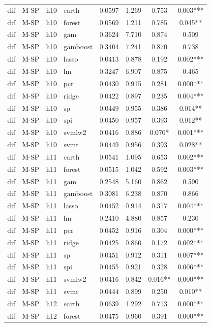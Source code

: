 \begin{ThreePartTable}
\begin{longtable}[t]{llclcccc}
\addlinespace
dif & M-SP & h10 & earth & 0.0597 & 1.269 & 0.753 & 0.003***\\
dif & M-SP & h10 & forest & 0.0569 & 1.211 & 0.785 & 0.045**\\
dif & M-SP & h10 & gam & 0.3624 & 7.710 & 0.874 & 0.509\\
dif & M-SP & h10 & gamboost & 0.3404 & 7.241 & 0.870 & 0.738\\
dif & M-SP & h10 & lasso & 0.0413 & 0.878 & 0.192 & 0.002***\\
dif & M-SP & h10 & lm & 0.3247 & 6.907 & 0.875 & 0.465\\
dif & M-SP & h10 & pcr & 0.0430 & 0.915 & 0.281 & 0.000***\\
dif & M-SP & h10 & ridge & 0.0422 & 0.897 & 0.235 & 0.004***\\
dif & M-SP & h10 & sp & 0.0449 & 0.955 & 0.386 & 0.014**\\
dif & M-SP & h10 & spi & 0.0450 & 0.957 & 0.393 & 0.012**\\
dif & M-SP & h10 & svmlw2 & 0.0416 & 0.886 & 0.070* & 0.001***\\
dif & M-SP & h10 & svmr & 0.0449 & 0.956 & 0.393 & 0.028**\\
\addlinespace
dif & M-SP & h11 & earth & 0.0541 & 1.095 & 0.653 & 0.002***\\
dif & M-SP & h11 & forest & 0.0515 & 1.042 & 0.592 & 0.003***\\
dif & M-SP & h11 & gam & 0.2548 & 5.160 & 0.862 & 0.590\\
dif & M-SP & h11 & gamboost & 0.3081 & 6.238 & 0.870 & 0.866\\
dif & M-SP & h11 & lasso & 0.0452 & 0.914 & 0.317 & 0.004***\\
dif & M-SP & h11 & lm & 0.2410 & 4.880 & 0.857 & 0.230\\
dif & M-SP & h11 & pcr & 0.0452 & 0.916 & 0.304 & 0.000***\\
dif & M-SP & h11 & ridge & 0.0425 & 0.860 & 0.172 & 0.002***\\
dif & M-SP & h11 & sp & 0.0451 & 0.912 & 0.311 & 0.007***\\
dif & M-SP & h11 & spi & 0.0455 & 0.921 & 0.328 & 0.006***\\
dif & M-SP & h11 & svmlw2 & 0.0416 & 0.842 & 0.016** & 0.000***\\
dif & M-SP & h11 & svmr & 0.0444 & 0.899 & 0.250 & 0.010**\\
\addlinespace
dif & M-SP & h12 & earth & 0.0639 & 1.292 & 0.713 & 0.000***\\
dif & M-SP & h12 & forest & 0.0475 & 0.960 & 0.391 & 0.000***\\

\end{longtable}
\end{ThreePartTable}

